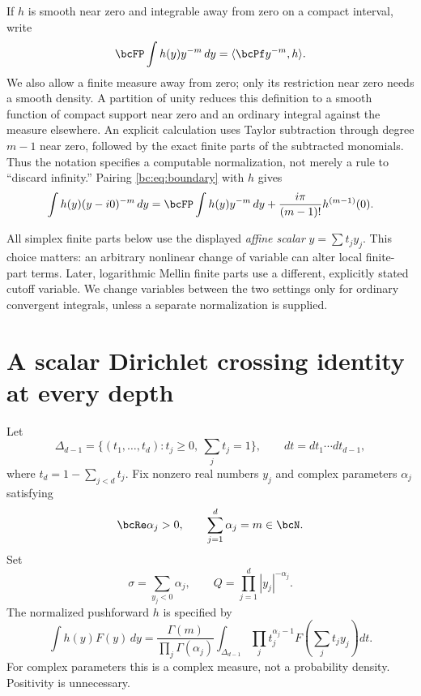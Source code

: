 If $h$ is smooth near zero and integrable away from zero on a compact
interval, write
\[
 \bcFP\int h(y)y^{-m}\,dy=\langle\bcPf y^{-m},h\rangle.
\]
We also allow a finite measure away from zero; only its restriction near
zero needs a smooth density. A partition of unity reduces this definition
to a smooth function of compact support near zero and an ordinary integral
against the measure elsewhere. An explicit
calculation uses Taylor subtraction through degree $m-1$ near zero,
followed by the exact finite parts of the subtracted monomials. Thus the
notation specifies a computable normalization, not merely a rule to
``discard infinity.'' Pairing \eqref{bc:eq:boundary} with $h$ gives
\begin{equation}\label{bc:eq:boundary-pair}
 \int h(y)(y-i0)^{-m}\,dy
 =\bcFP\int h(y)y^{-m}\,dy
       +\frac{i\pi}{(m-1)!}h^{(m-1)}(0).
\end{equation}

All simplex finite parts below use the displayed \emph{affine scalar}
$y=\sum t_j y_j$. This choice matters: an arbitrary nonlinear change of
variable can alter local finite-part terms. Later, logarithmic Mellin
finite parts use a different, explicitly stated cutoff variable. We
change variables between the two settings only for ordinary convergent
integrals, unless a separate normalization is supplied.

\section{A scalar Dirichlet crossing identity at every depth}
\label{bc:sec:scalar}

Let
\[
 \Delta_{d-1}=\{(t_1,\ldots,t_d):t_j\ge0,\ \sum_jt_j=1\},
 \qquad dt=dt_1\cdots dt_{d-1},
\]
where $t_d=1-\sum_{j<d}t_j$. Fix nonzero real numbers $y_j$ and complex
parameters $\alpha_j$ satisfying
\begin{equation}\label{bc:eq:scalar-assumptions}
 \bcRe\alpha_j>0,\qquad \sum_{j=1}^d\alpha_j=m\in\bcN.
\end{equation}
Set
\begin{equation}\label{bc:eq:scalar-data}
 \sigma=\sum_{y_j<0}\alpha_j,
 \qquad Q=\prod_{j=1}^d|y_j|^{-\alpha_j}.
\end{equation}
The normalized pushforward $h$ is specified by
\begin{equation}\label{bc:eq:pushforward}
 \int h(y)F(y)\,dy=
 \frac{\Gamma(m)}{\prod_j\Gamma(\alpha_j)}
 \int_{\Delta_{d-1}}\prod_jt_j^{\alpha_j-1}
                          F\left(\sum_jt_jy_j\right)dt.
\end{equation}
For complex parameters this is a complex measure, not a probability
density. Positivity is unnecessary.

